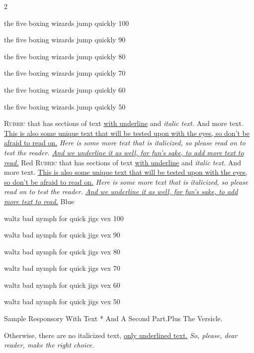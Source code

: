 \begin{multicols*}{2}
{\color{Red} }



\textcolor{black!100}{the five boxing wizards jump quickly 100}
\par \textcolor{black!90}{the five boxing wizards jump quickly 90}
\par \textcolor{black!80}{the five boxing wizards jump quickly 80}
\par \textcolor{black!70}{the five boxing wizards jump quickly 70}
\par \textcolor{black!60}{the five boxing wizards jump quickly 60}
\par \textcolor{black!50}{the five boxing wizards jump quickly 50}


\lettrine[lines=2]{\zallmancaps \color{Red} R}{ubric} that has sections of text \ul{with underline} and \emph{italic text.} And more text. \ul{This is also some unique text that will be tested upon with the eyes, so don't be afraid to read on.} \emph{Here is some more text that is italicized, so please read on to test the reader. \ul{And we underline it as well, for fun's sake, to add more text to read.}} Red
\lettrine[lines=2]{\zallmancaps \color{Blue} R}{ubric} that has sections of text \ul{with underline} and \emph{italic text.} And more text. \ul{This is also some unique text that will be tested upon with the eyes, so don't be afraid to read on.} \emph{Here is some more text that is italicized, so please read on to test the reader. \ul{And we underline it as well, for fun's sake, to add more text to read.}} Blue


\textcolor{black!100}{waltz bad nymph for quick jigs vex 100}
\par \textcolor{black!90}{waltz bad nymph for quick jigs vex 90}
\par \textcolor{black!80}{waltz bad nymph for quick jigs vex 80}
\par \textcolor{black!70}{waltz bad nymph for quick jigs vex 70}
\par \textcolor{black!60}{waltz bad nymph for quick jigs vex 60}
\par \textcolor{black!50}{waltz bad nymph for quick jigs vex 50}

\begin{responsory-breve}
{Sample Responsory With Text * And A Second Part.}{Plus The Versicle.}
\end{responsory-breve}%

\newline Otherwise, there are no italicized text, \ul{only underlined text.} \emph{So, please, dear reader, make the right choice.}


\end{multicols*}

